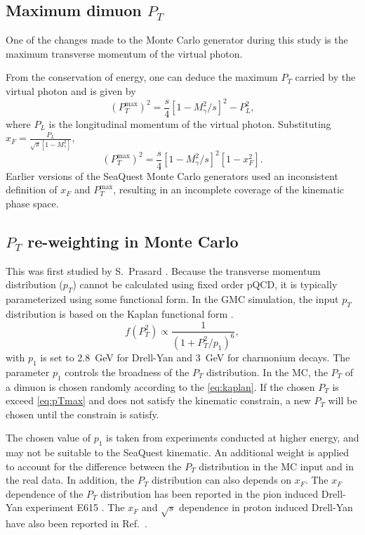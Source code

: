 \documentclass[../main.tex]{subfiles}
\begin{document}

\subsection{Maximum dimuon \texorpdfstring{$P_T$}{P\_T}}
One of the changes made to the Monte Carlo generator during this study
is the maximum transverse momentum of the virtual photon.

From the conservation of energy, one can deduce the maximum $P_T$ carried by the virtual photon
and is given by
\begin{equation}
	\left(P_T^{\mathrm{max}}\right)^2 = \frac{s}{4} \left[1-M^2_\gamma/s\right]^2 - P_L^2,
\end{equation}
where $P_L$ is the longitudinal momentum of the virtual photon.
Substituting $x_F = \frac{P_L}{\sqrt{s}\left[1-M^2_\gamma\right]}$,
\begin{equation}
	\left(P_T^{\mathrm{max}}\right)^2 = \frac{s}{4} \left[1-M^2_\gamma/s\right]^2\left[1-x_F^2\right].
	\label{eq:pTmax}
\end{equation}
Earlier versions of the SeaQuest Monte Carlo generators used an inconsistent definition of $x_F$
and $P_T^{\mathrm{max}}$, resulting in an incomplete coverage of the kinematic phase space.

\subsection{\texorpdfstring{$P_T$}{P\_T} re-weighting in Monte Carlo}
This was first studied by S.~Prasard \cite{prasad2020}.
Because the transverse momentum distribution ($p_T$) cannot be calculated using
fixed order pQCD, it is typically parameterized using some functional form.
In the GMC simulation, the input $p_T$ distribution is based on the
Kaplan functional form \cite{kaplan1978}.
\begin{equation}
	f\left(P_T^2\right) \propto \frac{1}{\left(1+ P_T^2/p_1\right)^6},
	\label{eq:kaplan}
\end{equation}
with $p_1$ is set to \SI{2.8}{\GeV} for Drell-Yan and \SI{3}{\GeV} for charmonium
decays. The parameter $p_1$ controls the broadness
of the $P_T$ distribution. In the MC, the $P_T$ of a dimuon is chosen randomly
according to the \cref{eq:kaplan}. If the chosen $P_T$ is exceed \cref{eq:pTmax}
and does not satisfy the kinematic constrain, a new $P_T$ will be chosen until
the constrain is satisfy.

The chosen value of $p_1$ is taken from experiments conducted at higher
energy, and may not be suitable to the SeaQuest kinematic. An additional weight is
applied to account for the difference between the $P_T$ distribution in the MC input
and in the real data. In addition, the $P_T$ distribution can also depends on $x_F$.
The $x_F$ dependence of the $P_T$ distribution has been reported in the pion induced
Drell-Yan experiment E615 \cite{conway1989}. The $x_F$ and $\sqrt{s}$ dependence in
proton induced Drell-Yan have also been reported in Ref.~\cite{prasad2020}.
\end{document}
